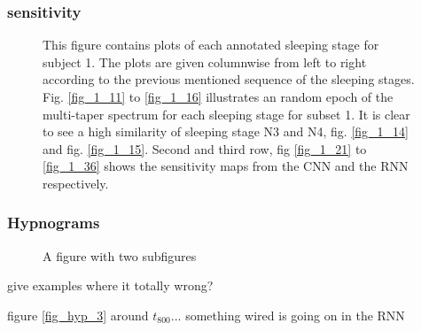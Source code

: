\subsubsection{sensitivity}


\begin{figure*}[th!]
\centering

\caption{This figure contains plots of each annotated sleeping stage for subject 1. The plots are given columnwise from left to right according to the previous mentioned sequence of the sleeping stages. Fig. \ref{fig_1_11} to \ref{fig_1_16} illustrates an random epoch of the multi-taper spectrum for each sleeping stage for subset 1. It is clear to see a high similarity of sleeping stage N3 and N4, fig. \ref{fig_1_14} and fig. \ref{fig_1_15}. Second and third row, fig \ref{fig_1_21} to \ref{fig_1_36} shows the sensitivity maps from the CNN and the RNN respectively.}
\label{fig_1}
\end{figure*}



\subsubsection{Hypnograms}


\begin{figure*}[th!]
\centering

\caption{A figure with two subfigures}
\label{fig_hyp}
\end{figure*}

give examples where it totally wrong?


figure \ref{fig_hyp_3} around $t_{800}$... something wired is going on in the RNN




